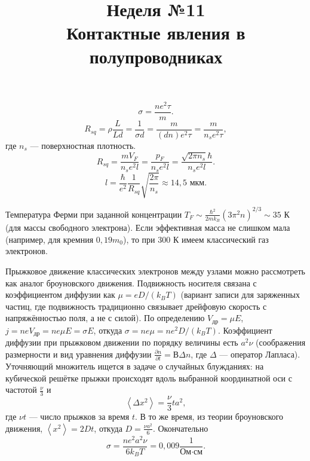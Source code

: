 \documentclass[a4paper]{article}
\title{Неделя №11\\
Контактные явления в полупроводниках}
\begin{document}
	\maketitle
\begin{hiProb}[4.16]
\end{hiProb}
\begin{sol}
\[
\sigma= \frac{n e^2 \tau}{m}
.\] 
\[
R_{s q}= \rho \frac{L}{L d}= \frac{1}{\sigma d}=
\frac{m}{(d n)e^2 \tau}= \frac{m }{n_s e^2 \tau}
,\] 
где $n_s$ --- поверхностная плотность.
\[
R_{sq}= \frac{m V_F}{n_s e^2 l}= \frac{p_F}{n_s e^2 l}=
\frac{\sqrt{2 \pi n_s}  \hbar }{n_s e^2 l}
.\] 
\[
l= \frac{\hbar }{e^2} \frac{1}{R_{sq}}
\sqrt{\frac{2\pi}{n_s}} \approx 14,5 \text{ мкм}
.\] 
\end{sol}
\begin{hiProb}[4.20]
\end{hiProb}
\begin{sol}
Температура Ферми при заданной концентрации $T_F \sim 
\frac{\hbar ^2}{2m k_B} \left( 3\pi ^2 n \right) ^{2 /3}
\sim 35$ К (для массы свободного электрона). Если
эффективная масса не слишком мала (например, для
кремния $0,19 m_0$), то при 300 К имеем классический газ
электронов.

Прыжковое движение классических электронов между узлами
можно рассмотреть как аналог броуновского движения.
Подвижность носителя связана с коэффициентом диффузии
как $\mu = eD /(k_B T)$ (вариант записи для заряженных
частиц, где подвижность традиционно связывает
дрейфовую скорость с напряжённостью поля, а не с силой).
По определению $V_{\text{др}}= \mu E$, $j= neV_\text{др}=
n e \mu E= \sigma E$, откуда $\sigma= ne \mu=ne^2 D/(k_BT)$.
Коэффициент диффузии при прыжковом движении по порядку
величины есть $a^2 \nu$ (соображения размерности и
вид уравнения диффузии $\frac{\partial n}{\partial t} =
В\Delta n$, где $\Delta$ --- оператор Лапласа). Уточняющий
множитель ищется в задаче о случайных блужданиях: на
кубической решётке прыжки происходят вдоль выбранной
координатной оси с частотой $\frac{\nu}{3}$ и 
\[
\left<\Delta x^2 \right> = \frac{\nu}{3}ta^2,
\]
где $\nu t$ --- число прыжков за время $t$. В то же
время, из теории броуновского движения,  $\left<x^2 \right> =2Dt$, откуда $D= \frac{\nu a^2}{6}$. Окончательно
\[
\sigma= \frac{ne^2 a^2 \nu}{6k_B T}= 0,009 \frac{1}{\text{Ом}\cdot \text{см}}
.\] 
\end{sol}
\begin{hiProb}[Т11-2]
\end{hiProb}
\end{document}
